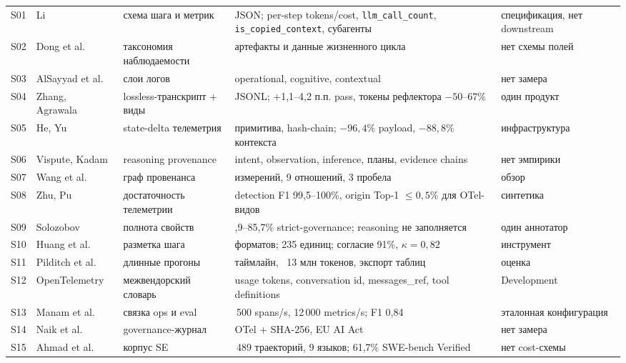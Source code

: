 \documentclass[11pt,a4paper]{article}
\begin{document}
{\begin{longtable}{@{}>{\raggedright\arraybackslash}p{0.55cm}>{\raggedright\arraybackslash}p{3.0cm}>{\raggedright\arraybackslash}p{2.7cm}>{\raggedright\arraybackslash}p{4.3cm}>{\raggedright\arraybackslash}p{3.0cm}@{}}
S01 & Li~\cite{atif2026} & схема шага и метрик & JSON; per-step tokens/cost, \texttt{llm\_call\_count}, \texttt{is\_copied\_context}, субагенты & спецификация, нет downstream \\
S02 & Dong et al.~\cite{dong2024agentops} & таксономия наблюдаемости & артефакты и данные жизненного цикла & нет схемы полей \\
S03 & AlSayyad et al.~\cite{alsayyad2026agenttrace} & слои логов & operational, cognitive, contextual & нет замера \\
S04 & Zhang, Agrawala~\cite{zhang2026vcc} & lossless-транскрипт + виды & JSONL; +1,1--4,2 п.п. pass, токены рефлектора $-50$--$67\%$ & один продукт \\
S05 & He, Yu~\cite{he2026atp} & state-delta телеметрия & 4 примитива, hash-chain; $-96{,}4\%$ payload, $-88{,}8\%$ контекста & инфраструктура \\
S06 & Vispute, Kadam~\cite{vispute2026aer} & reasoning provenance & intent, observation, inference, планы, evidence chains & нет эмпирики \\
S07 & Wang et al.~\cite{wang2026trust} & граф провенанса & 6 измерений, 9 отношений, 3 пробела & обзор \\
S08 & Zhu, Pu~\cite{zhu2026telemetrysuff} & достаточность телеметрии & detection F1 99,5--100\%, origin Top-1 $\le 0{,}5\%$ для OTel-видов & синтетика \\
S09 & Solozobov~\cite{solozobov2026reconstruct} & полнота свойств & 42,9--85,7\% strict-governance; reasoning не заполняется & один аннотатор \\
S10 & Huang et al.~\cite{huang2026annotrace} & разметка шага & 6 форматов; 235 единиц; согласие 91\%, $\kappa=0{,}82$ & инструмент \\
S11 & Pilditch et al.~\cite{pilditch2026transect} & длинные прогоны & таймлайн, ~13 млн токенов, экспорт таблиц & оценка \\
S12 & OpenTelemetry~\cite{otel2026genai} & межвендорский словарь & usage tokens, conversation id, messages\_ref, tool definitions & Development \\
S13 & Manam et al.~\cite{manam2026otel} & связка ops и eval & 8\,500 spans/s, 12\,000 metrics/s; F1 0,84 & эталонная конфигурация \\
S14 & Naik et al.~\cite{naik2026traccia} & governance-журнал & OTel + SHA-256, EU AI Act & нет замера \\
S15 & Ahmad et al.~\cite{ahmad2026openswe} & корпус SE & 207\,489 траекторий, 9 языков; 61,7\% SWE-bench Verified & нет cost-схемы \\

\end{longtable}}
\end{document}

